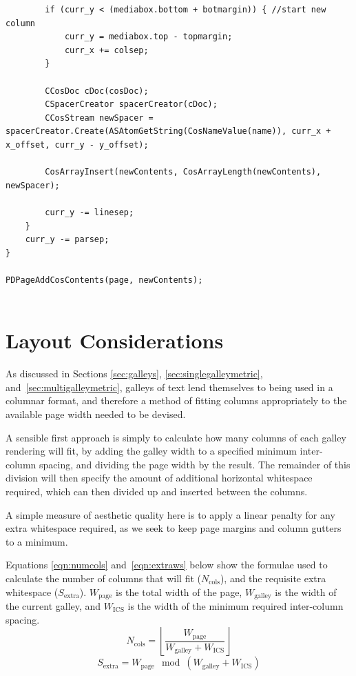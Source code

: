 \begin{lstlisting}
        if (curr_y < (mediabox.bottom + botmargin)) { //start new column
            curr_y = mediabox.top - topmargin;
            curr_x += colsep;
        }
        
        CCosDoc cDoc(cosDoc);
        CSpacerCreator spacerCreator(cDoc);
        CCosStream newSpacer = spacerCreator.Create(ASAtomGetString(CosNameValue(name)), curr_x + x_offset, curr_y - y_offset);
        
        CosArrayInsert(newContents, CosArrayLength(newContents), newSpacer);
        
        curr_y -= linesep;
    }
    curr_y -= parsep;
}

PDPageAddCosContents(page, newContents);


\end{lstlisting}


\section{Layout Considerations}
\label{sec:layout}


As discussed in Sections \ref{sec:galleys}, \ref{sec:singlegalleymetric}, and~\ref{sec:multigalleymetric}, galleys of text lend themselves to being used in a columnar format, and therefore a method of fitting columns appropriately to the available page width needed to be devised.

A sensible first approach is simply to calculate how many columns of each galley rendering will fit, by adding the galley width to a specified minimum inter-column spacing, and dividing the page width by the result. The remainder of this division will then specify the amount of additional horizontal whitespace required, which can then divided up and inserted between the columns.

A simple measure of aesthetic quality here is to apply a linear penalty for any extra whitespace required, as we seek to keep page margins and column gutters to a minimum.

Equations \ref{eqn:numcols} and~\ref{eqn:extraws} below show the formulae used to calculate the number of columns that will fit ($N_\text{cols}$), and the requisite extra whitespace ($S_\text{extra}$). $W_\text{page}$ is the total width of the page, $W_\text{galley}$ is the width of the current galley, and $W_\text{ICS}$ is the width of the minimum required inter-column spacing.
\begin{equation}\label{eqn:numcols}
N_\text{cols}=\left\lfloor\frac{W_\text{page}}{W_\text{galley}+W_\text{ICS}}\right\rfloor
\end{equation}
\begin{equation}\label{eqn:extraws}
S_\text{extra}=W_\text{page}\!\!\mod \left(W_\text{galley}+W_\text{ICS}\right)
\end{equation}

